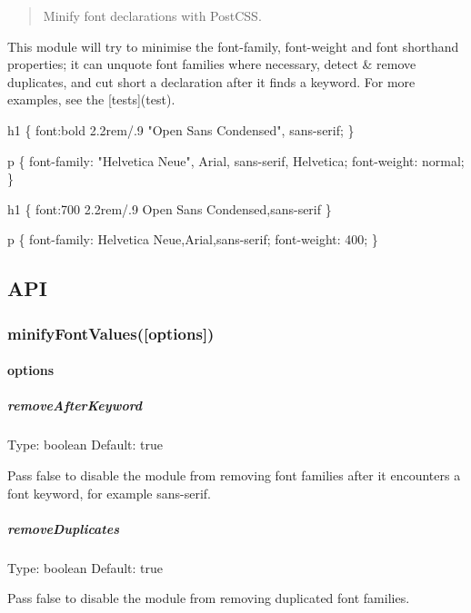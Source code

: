 \begin{quote}
Minify font declarations with Post\+C\+SS. \end{quote}


This module will try to minimise the {\ttfamily font-\/family}, {\ttfamily font-\/weight} and {\ttfamily font} shorthand properties; it can unquote font families where necessary, detect \& remove duplicates, and cut short a declaration after it finds a keyword. For more examples, see the \mbox{[}tests\mbox{]}(test).


\begin{DoxyCode}
h1 \{
  font:bold 2.2rem/.9 "Open Sans Condensed", sans-serif;
\}

p \{
  font-family: "Helvetica Neue", Arial, sans-serif, Helvetica;
  font-weight: normal;
\}
\end{DoxyCode}



\begin{DoxyCode}
h1 \{
  font:700 2.2rem/.9 Open Sans Condensed,sans-serif
\}

p \{
  font-family: Helvetica Neue,Arial,sans-serif;
  font-weight: 400;
\}
\end{DoxyCode}


\subsection*{A\+PI}

\subsubsection*{minify\+Font\+Values(\mbox{[}options\mbox{]})}

\paragraph*{options}

\subparagraph*{remove\+After\+Keyword}

Type\+: {\ttfamily boolean} Default\+: {\ttfamily true}

Pass {\ttfamily false} to disable the module from removing font families after it encounters a font keyword, for example {\ttfamily sans-\/serif}.

\subparagraph*{remove\+Duplicates}

Type\+: {\ttfamily boolean} Default\+: {\ttfamily true}

Pass {\ttfamily false} to disable the module from removing duplicated font families.

